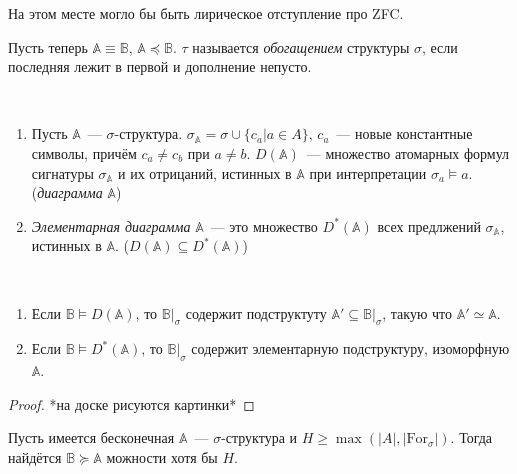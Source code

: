 \begin{remark}
    На этом месте могло бы быть лирическое отступление про ZFC. 
\end{remark}

Пусть теперь $\mathbb{A} \equiv \mathbb{B}$, $\mathbb{A} \preceq \mathbb{B}$. $\tau$ называется \textit{обогащением} структуры $\sigma$, если последняя лежит в первой и дополнение непусто.

\begin{definition} \

    \begin{enumerate}
        \item Пусть $\mathbb{A}$~— $\sigma$-структура. $\sigma_{\mathbb{A}} = \sigma \cup \{c_a | a \in A\}$, $c_a$~— новые константные символы, причём $c_a \neq c_b$ при $a \neq b$. $D(\mathbb{A})$~— множество атомарных формул сигнатуры $\sigma_{\mathbb{A}}$ и их отрицаний, истинных в $\mathbb{A}$ при интерпретации $\sigma_a \models a$. (\textit{диаграмма} $\mathbb{A}$) 
        \item \textit{Элементарная диаграмма} $\mathbb{A}$~— это множество $D^*(\mathbb{A})$ всех предлжений $\sigma_{\mathbb{A}}$, истинных в $\mathbb{A}$. ($D(\mathbb{A}) \subseteq D^*(\mathbb{A})$)
    \end{enumerate}
\end{definition}

\begin{stat} \ 

    \begin{enumerate}
        \item Если $\mathbb{B} \models D(\mathbb{A})$, то $\mathbb{B}|_{\sigma}$ содержит подструктуту $\mathbb{A}' \subseteq \mathbb{B}|_{\sigma}$, такую что $\mathbb{A}' \simeq \mathbb{A}$. 
        \item Если $\mathbb{B} \models D^*(\mathbb{A})$, то $\mathbb{B}|_{\sigma}$ содержит элементарную подструктуру, изоморфную $\mathbb{A}$. 
    \end{enumerate}
\end{stat}

\begin{proof}
    *на доске рисуются картинки*
\end{proof} 

\begin{theorem}
    Пусть имеется бесконечная $\mathbb{A}$~— $\sigma$-структура и $H \geq \max(|A|, |\text{For}_\sigma|)$. Тогда найдётся $\mathbb{B} \succeq \mathbb{A}$ можности хотя бы $H$.
\end{theorem}

